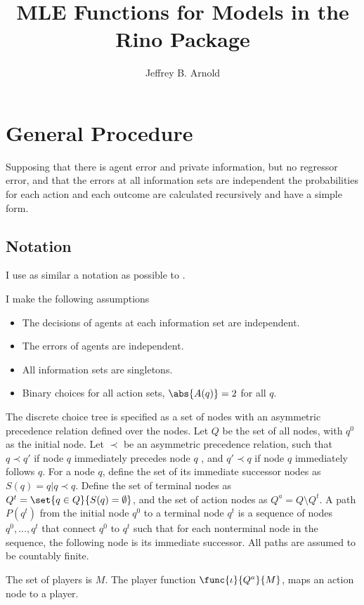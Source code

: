 \documentclass{article}
\author{Jeffrey B. Arnold}
\title{MLE Functions for Models in the Rino Package}
\begin{document}
\section{General Procedure}

Supposing that there is agent error and private information, but no regressor error, 
and that the errors at all information sets are independent the probabilities for
each action and each outcome are calculated recursively and have a simple form.

\subsection{Notation}

I use as similar a notation as possible to \cite{Signorino2003}.

I make the following assumptions 
\begin{itemize}
\item The decisions of agents at each information set are independent.

\item The errors of agents are independent.

\item All information sets are singletons.

\item Binary choices for all action sets, $\abs{A(q)} = 2$ for all $q$.
\end{itemize}

The discrete choice tree is specified as a set of nodes with an asymmetric precedence
relation defined over the nodes. 
Let $Q$ be the set of all nodes, with $q^{0}$ as the initial node. 
Let $\prec$ be an asymmetric precedence relation, such that $q \prec q'$ if node $q$ immediately precedes
node $q$ , and $q' \prec q$ if node $q$ immediately follows $q$. 
For a node $q$, define the set of its immediate successor nodes as $S(q) = {q | q \prec q }$.
Define the set of terminal nodes as $Q^{t} = \set{q \in Q}{S(q) = \emptyset }$, and the set of action nodes as $Q^{a} = Q \setminus Q^{t}$.
A path $P(q^{t})$ from the initial node $q^{0}$ to a terminal node $q^{t}$ is a sequence of nodes $q^{0}, \dots, q^{t}$ that connect $q^{0}$ to $q^{t}$ such that for each nonterminal node in the sequence, the following node is its immediate successor. 
All paths are assumed to be countably finite. 

The set of players is $M$. 
The player function $\func{\iota}{Q^{a}}{M}$, maps an action node to a player.
\end{document}

